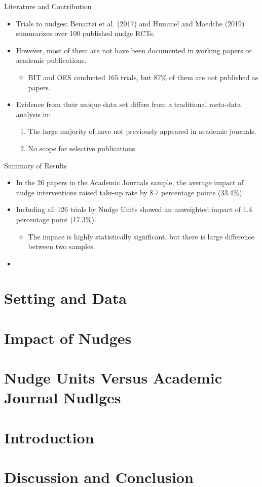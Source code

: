 \documentclass[dvipdfmx,11pt]{beamer}
\begin{document}
\begin{frame}{Literature and Contribution}
  \begin{itemize}
    \item Trials to nudges: Benartzi et al. (2017) and Hummel and Maedche (2019) summarizes over 100 published nudge RCTs.
    \item However, most of them are not have been documented in working papers or academic publications.
    \begin{itemize}
      \item BIT and OES conducted 165 trials, but 87\% of them are not published as papers.
    \end{itemize}
    \item Evidence from their unique data set differs from a traditional meta-data analysis in:
    \begin{enumerate}
      \item The large majority of have not previously appeared in academic journals.
      \item No scope for selective publications.
    \end{enumerate}
  \end{itemize}
\end{frame}

\begin{frame}{Summary of Results}
  \begin{itemize}
    \item In the 26 papers in the Academic Journals sample, the average impact of nudge interventions raised take-up rate by 8.7 percentage points (33.4\%).
    \item Including all 126 trials by Nudge Units showed an unweighted impact of 1.4 percentage point (17.3\%).
    \begin{itemize}
      \item The impace is highly statistically significant, but there is large difference between two samples. 
    \end{itemize}
    \item 
  \end{itemize}
\end{frame}

\section{Setting and Data}
\frame{\sectionpage}

\section{Impact of Nudges}
\frame{\sectionpage}

\section{Nudge Units Versus Academic Journal Nudlges}
\frame{\sectionpage}

\section{Introduction}
\frame{\sectionpage}

\section{Discussion and Conclusion}
\frame{\sectionpage}
\end{document}
